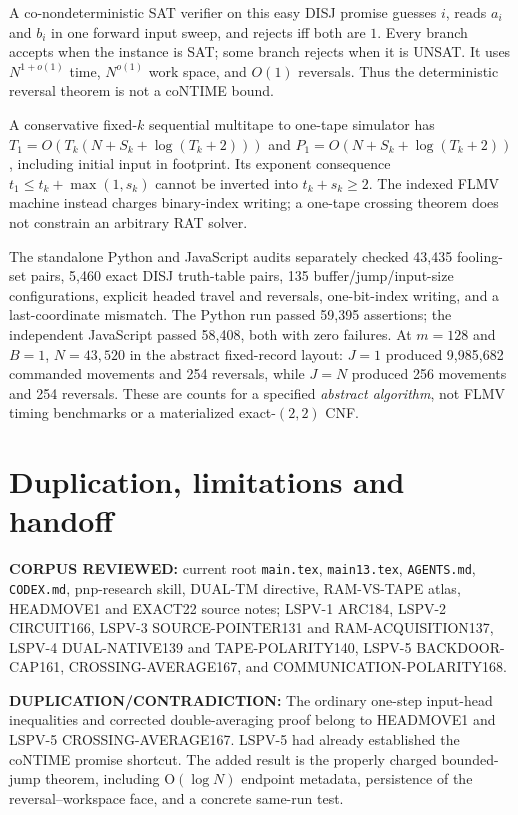 \documentclass[11pt]{article}
\begin{document}
A co-nondeterministic SAT verifier on this easy DISJ promise
guesses $i$, reads $a_i$ and $b_i$ in one forward input sweep,
and rejects iff both are $1$.
Every branch accepts when the instance is SAT; some branch rejects
when it is UNSAT. It uses $N^{1+o(1)}$ time,
$N^{o(1)}$ work space, and $O(1)$ reversals.
Thus the deterministic reversal theorem is not a coNTIME bound.

A conservative fixed-$k$ sequential multitape to one-tape simulator has
$T_1=O(T_k(N+S_k+\log(T_k+2)))$ and
$P_1=O(N+S_k+\log(T_k+2))$, including initial input in footprint.
Its exponent consequence $t_1\le t_k+\max(1,s_k)$
cannot be inverted into $t_k+s_k\ge2$.
The indexed FLMV machine instead charges binary-index writing;
a one-tape crossing theorem does not constrain an arbitrary RAT solver.

The standalone Python and JavaScript audits separately checked
43,435 fooling-set pairs, 5,460 exact DISJ truth-table pairs,
135 buffer/jump/input-size configurations, explicit headed travel
and reversals, one-bit-index writing, and a last-coordinate mismatch.
The Python run passed 59,395 assertions; the independent JavaScript
passed 58,408, both with zero failures.
At $m=128$ and $B=1$, $N=43,520$ in the abstract fixed-record layout:
$J=1$ produced 9,985,682 commanded movements and 254 reversals,
while $J=N$ produced 256 movements and 254 reversals.
These are counts for a specified \emph{abstract algorithm},
not FLMV timing benchmarks or a materialized exact-$(2,2)$ CNF.

\section{Duplication, limitations and handoff}
\noindent\textbf{CORPUS REVIEWED:} current root \texttt{main.tex},
\texttt{main13.tex}, \texttt{AGENTS.md}, \texttt{CODEX.md},
pnp-research skill, DUAL-TM directive, RAM-VS-TAPE atlas,
HEADMOVE1 and EXACT22 source notes; LSPV-1 ARC184,
LSPV-2 CIRCUIT166, LSPV-3 SOURCE-POINTER131 and RAM-ACQUISITION137,
LSPV-4 DUAL-NATIVE139 and TAPE-POLARITY140,
LSPV-5 BACKDOOR-CAP161, CROSSING-AVERAGE167, and
COMMUNICATION-POLARITY168.

\noindent\textbf{DUPLICATION/CONTRADICTION:}
The ordinary one-step input-head inequalities and corrected
double-averaging proof belong to HEADMOVE1 and LSPV-5 CROSSING-AVERAGE167.
LSPV-5 had already established the coNTIME promise shortcut.
The added result is the properly charged bounded-jump theorem,
including O$(\log N)$ endpoint metadata,
persistence of the reversal--workspace face, and
a concrete same-run test.
\end{document}
